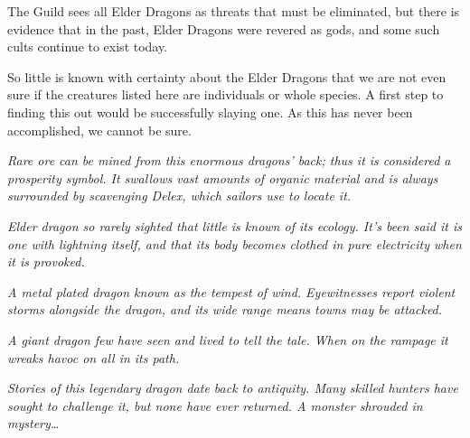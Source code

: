 The Guild sees all Elder Dragons as threats that must be eliminated, but there is evidence that in the past, Elder Dragons were revered as gods, and some such cults continue to exist today.

So little is known with certainty about the Elder Dragons that we are not even sure if the creatures listed here are individuals or whole species. A first step to finding this out would be successfully slaying one. As this has never been accomplished, we cannot be sure.

\textit{Rare ore can be mined from this enormous dragons' back; thus it is considered a prosperity symbol. It swallows vast amounts of organic material and is always surrounded by scavenging Delex, which sailors use to locate it.}

\textit{Elder dragon so rarely sighted that little is known of its ecology. It's been said it is one with lightning itself, and that its body becomes clothed in pure electricity when it is provoked.}

\textit{A metal plated dragon known as the tempest of wind. Eyewitnesses report violent storms alongside the dragon, and its wide range means towns may be attacked.}

\textit{A giant dragon few have seen and lived to tell the tale. When on the rampage it wreaks havoc on all in its path.}

\textit{Stories of this legendary dragon date back to antiquity. Many skilled hunters have sought to challenge it, but none have ever returned. A monster shrouded in mystery\ldots}

